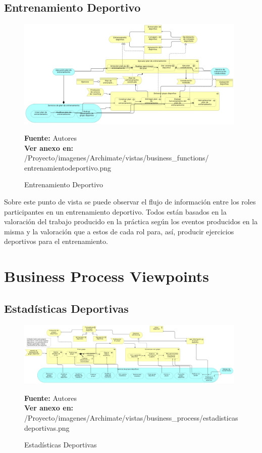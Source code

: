 \subsection{Entrenamiento Deportivo}

\begin{figure}[!htb]
  \begin{center}
    \includegraphics[width=11cm]{./imagenes/Archimate/vistas/business_functions/entrenamientodeportivo.png}
    \caption{Entrenamiento Deportivo}
    \label{fig:bf_entrenamiento_deportivo}
    \textbf{Fuente:}  Autores \\
     \textbf{Ver anexo en:} /Proyecto/imagenes/Archimate/vistas/business\_functions/
     entrenamientodeportivo.png
  \end{center}
\end{figure}

Sobre este punto de vista se puede observar el flujo de información entre los roles participantes en un entrenamiento deportivo. Todos están basados en la valoración del trabajo producido en la práctica según los eventos producidos en la misma y la valoración que a estos de cada rol para, así, producir ejercicios deportivos para el entrenamiento.

\section{Business Process Viewpoints}

\subsection{Estadísticas Deportivas}

\begin{figure}[!htb]
  \begin{center}
    \includegraphics[width=11cm]{./imagenes/Archimate/vistas/business_process/estadisticasdeportivas.png}
    \caption{Estadísticas Deportivas}
    \label{fig:bp_estadisticas_deportivo}
    \textbf{Fuente:}  Autores \\
     \textbf{Ver anexo en:} /Proyecto/imagenes/Archimate/vistas/business\_process/estadisticasdeportivas.png
  \end{center}
\end{figure}

